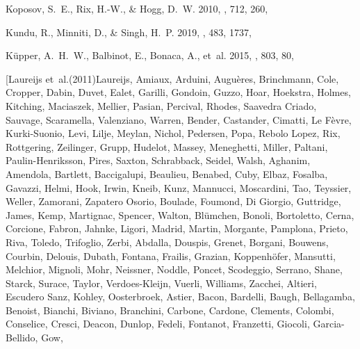 \documentclass[twocolumn]{aastex631}
\begin{document}
\begin{thebibliography}{}
{Koposov}, S.~E., {Rix}, H.-W., \& {Hogg}, D.~W. 2010, \apj, 712, 260,

{Kundu}, R., {Minniti}, D., \& {Singh}, H.~P. 2019, \mnras, 483, 1737,

{K{\"u}pper}, A.~H.~W., {Balbinot}, E., {Bonaca}, A., {et~al.} 2015, \apj, 803,
  80, 

\bibitem[{{Laureijs} {et~al.}(2011){Laureijs}, {Amiaux}, {Arduini},
  {Augu{\`e}res}, {Brinchmann}, {Cole}, {Cropper}, {Dabin}, {Duvet}, {Ealet},
  {Garilli}, {Gondoin}, {Guzzo}, {Hoar}, {Hoekstra}, {Holmes}, {Kitching},
  {Maciaszek}, {Mellier}, {Pasian}, {Percival}, {Rhodes}, {Saavedra Criado},
  {Sauvage}, {Scaramella}, {Valenziano}, {Warren}, {Bender}, {Castander},
  {Cimatti}, {Le F{\`e}vre}, {Kurki-Suonio}, {Levi}, {Lilje}, {Meylan},
  {Nichol}, {Pedersen}, {Popa}, {Rebolo Lopez}, {Rix}, {Rottgering},
  {Zeilinger}, {Grupp}, {Hudelot}, {Massey}, {Meneghetti}, {Miller}, {Paltani},
  {Paulin-Henriksson}, {Pires}, {Saxton}, {Schrabback}, {Seidel}, {Walsh},
  {Aghanim}, {Amendola}, {Bartlett}, {Baccigalupi}, {Beaulieu}, {Benabed},
  {Cuby}, {Elbaz}, {Fosalba}, {Gavazzi}, {Helmi}, {Hook}, {Irwin}, {Kneib},
  {Kunz}, {Mannucci}, {Moscardini}, {Tao}, {Teyssier}, {Weller}, {Zamorani},
  {Zapatero Osorio}, {Boulade}, {Foumond}, {Di Giorgio}, {Guttridge}, {James},
  {Kemp}, {Martignac}, {Spencer}, {Walton}, {Bl{\"u}mchen}, {Bonoli},
  {Bortoletto}, {Cerna}, {Corcione}, {Fabron}, {Jahnke}, {Ligori}, {Madrid},
  {Martin}, {Morgante}, {Pamplona}, {Prieto}, {Riva}, {Toledo}, {Trifoglio},
  {Zerbi}, {Abdalla}, {Douspis}, {Grenet}, {Borgani}, {Bouwens}, {Courbin},
  {Delouis}, {Dubath}, {Fontana}, {Frailis}, {Grazian}, {Koppenh{\"o}fer},
  {Mansutti}, {Melchior}, {Mignoli}, {Mohr}, {Neissner}, {Noddle}, {Poncet},
  {Scodeggio}, {Serrano}, {Shane}, {Starck}, {Surace}, {Taylor},
  {Verdoes-Kleijn}, {Vuerli}, {Williams}, {Zacchei}, {Altieri}, {Escudero
  Sanz}, {Kohley}, {Oosterbroek}, {Astier}, {Bacon}, {Bardelli}, {Baugh},
  {Bellagamba}, {Benoist}, {Bianchi}, {Biviano}, {Branchini}, {Carbone},
  {Cardone}, {Clements}, {Colombi}, {Conselice}, {Cresci}, {Deacon}, {Dunlop},
  {Fedeli}, {Fontanot}, {Franzetti}, {Giocoli}, {Garcia-Bellido}, {Gow},
}
\end{thebibliography}
\end{document}
